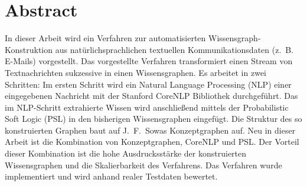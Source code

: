 %
\chapter*{Abstract}%
\label{sec:abstract}
\vspace*{-10mm}

In dieser Arbeit wird ein Verfahren zur automatisierten Wissensgraph-Konstruktion aus natürlichsprachlichen textuellen Kommunikationsdaten (z.~B. E-Mails) vorgestellt.
Das vorgestellte Verfahren transformiert einen Stream von Textnachrichten sukzessive in einen Wissensgraphen.
Es arbeitet in zwei Schritten:
Im ersten Schritt wird ein Natural Language Processing (NLP) einer eingegebenen Nachricht mit der Stanford CoreNLP Bibliothek durchgeführt.
Das im NLP-Schritt extrahierte Wissen wird anschließend mittels der Probabilistic Soft Logic (PSL) in den bisherigen Wissensgraphen eingefügt.
Die Struktur des so konstruierten Graphen baut auf J.~F.~Sowas Konzeptgraphen auf.
Neu in dieser Arbeit ist die Kombination von Konzeptgraphen, CoreNLP und PSL.\@
Der Vorteil dieser Kombination ist die hohe Ausdrucksstärke der konstruierten Wissensgraphen und die Skalierbarkeit des Verfahrens.
Das Verfahren wurde implementiert und wird anhand realer Testdaten bewertet.

